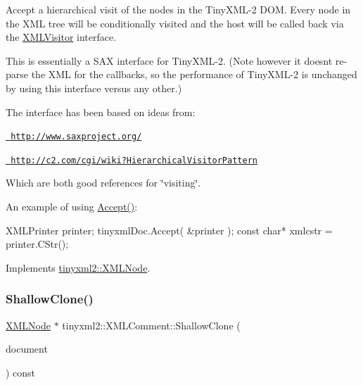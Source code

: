 Accept a hierarchical visit of the nodes in the Tiny\+X\+M\+L-\/2 D\+OM. Every node in the X\+ML tree will be conditionally visited and the host will be called back via the \mbox{\hyperlink{classtinyxml2_1_1_x_m_l_visitor}{X\+M\+L\+Visitor}} interface.

This is essentially a S\+AX interface for Tiny\+X\+M\+L-\/2. (Note however it doesn\textquotesingle{}t re-\/parse the X\+ML for the callbacks, so the performance of Tiny\+X\+M\+L-\/2 is unchanged by using this interface versus any other.)

The interface has been based on ideas from\+:


\begin{DoxyItemize}
\item \href{http://www.saxproject.org/}{\texttt{ http\+://www.\+saxproject.\+org/}}
\item \href{http://c2.com/cgi/wiki?HierarchicalVisitorPattern}{\texttt{ http\+://c2.\+com/cgi/wiki?\+Hierarchical\+Visitor\+Pattern}}
\end{DoxyItemize}

Which are both good references for \char`\"{}visiting\char`\"{}.

An example of using \mbox{\hyperlink{classtinyxml2_1_1_x_m_l_comment_a27b37d16cea01b5329dfbbb4f9508e39}{Accept()}}\+: \begin{DoxyVerb}XMLPrinter printer;
tinyxmlDoc.Accept( &printer );
const char* xmlcstr = printer.CStr();
\end{DoxyVerb}
 

Implements \mbox{\hyperlink{classtinyxml2_1_1_x_m_l_node_a81e66df0a44c67a7af17f3b77a152785}{tinyxml2\+::\+X\+M\+L\+Node}}.

\mbox{\label{classtinyxml2_1_1_x_m_l_comment_adf5b5c0319351dcc339df098d11e8fb2}} 
\subsubsection{\texorpdfstring{ShallowClone()}{ShallowClone()}}
{\footnotesize\ttfamily \mbox{\hyperlink{classtinyxml2_1_1_x_m_l_node}{X\+M\+L\+Node}} $\ast$ tinyxml2\+::\+X\+M\+L\+Comment\+::\+Shallow\+Clone (\begin{DoxyParamCaption}\item[{\mbox{\hyperlink{classtinyxml2_1_1_x_m_l_document}{X\+M\+L\+Document}} $\ast$}]{document }\end{DoxyParamCaption}) const\hspace{0.3cm}{\ttfamily [virtual]}}

